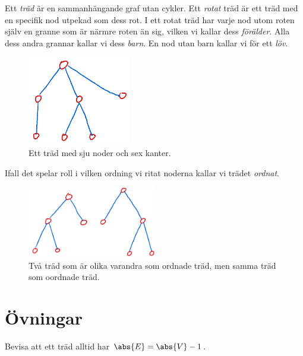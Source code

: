\documentclass[nobib]{tufte-handout}
\begin{document}
\begin{definition}
    Ett \emph{träd} är en sammanhängande graf utan cykler. Ett \emph{rotat} träd är ett träd med en specifik nod utpekad som dess rot. I ett rotat träd har varje nod utom roten själv en granne som är närmre roten än sig, vilken vi kallar dess \emph{förälder}. Alla dess andra grannar kallar vi dess \emph{barn}. En nod utan barn kallar vi för ett \emph{löv}.

    \begin{figure}
        \centering
        \includegraphics[width=0.4\textwidth]{graphics/example_tree.png}
        \caption{Ett träd med sju noder och sex kanter.}
    \end{figure}

    Ifall det spelar roll i vilken ordning vi ritat noderna kallar vi trädet \emph{ordnat}.

    \begin{figure}
        \centering
        \includegraphics[width=0.5\textwidth]{graphics/ordered_versus_unordered_trees.png}
        \caption{Två träd som är olika varandra som ordnade träd, men samma träd som oordnade träd.}
    \end{figure}
\end{definition}

\section{Övningar}

\begin{xca}
    Bevisa att ett träd alltid har $\abs{E} = \abs{V} - 1$.
\end{xca}

%
%
\end{document}
